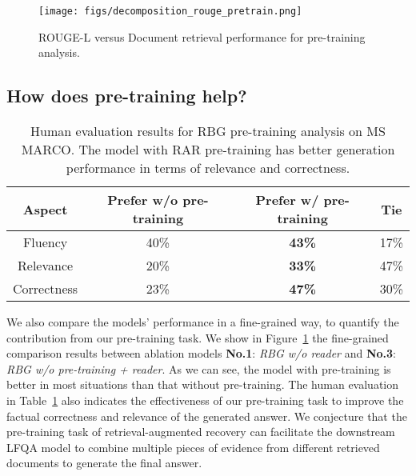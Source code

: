 \documentclass[11pt]{article}
\begin{document}
\begin{figure}[t]
\vspace{-5pt}
	\begin{center}
		\texttt{[image: figs/decomposition\_rouge\_pretrain.png]}
		\vspace{-5pt}
		\caption{ROUGE-L versus Document retrieval performance for pre-training analysis.}
		\label{Fig:decomp_for_pretrain}
	\end{center}
	\vspace{-10pt}
\end{figure}

\vspace{-5pt}
\subsection{How does pre-training help?}
\vspace{-5pt}

\begin{table}[]
\vspace{-10pt}
\resizebox{0.48\textwidth}{!}
{
\begin{tabular}{c|ccc}
\hline
Aspect    & Prefer w/o pre-training      & Prefer w/ pre-training      &  Tie \\ \hline
Fluency  &    40\%    & \textbf{43\%}   &    17\% \\
Relevance  &  20\%     & \textbf{33\%} & 47\% \\
Correctness &  23\%     & \textbf{47\%} & 30\% \\ \hline
\end{tabular}
}
\vspace{-5pt}
\caption{Human evaluation results for RBG pre-training analysis on MS MARCO. The model with RAR pre-training has better generation performance in terms of relevance and correctness.}
\label{tab:human eval pretrain}
\vspace{-10pt}
\end{table}

We also compare the models' performance in a fine-grained way, to quantify the contribution from our pre-training task. We show in Figure~\ref{Fig:decomp_for_pretrain} the fine-grained comparison results between ablation models \textbf{No.1}: \textit{RBG w/o reader} and \textbf{No.3}: \textit{RBG w/o pre-training + reader}. As we can see, the model with pre-training is better in most situations than that without pre-training. The human evaluation in Table~\ref{tab:human eval pretrain} also indicates the effectiveness of our pre-training task to improve the factual correctness and relevance of the generated answer. We conjecture that the pre-training task of retrieval-augmented recovery can facilitate the downstream LFQA model to combine multiple pieces of evidence from different retrieved documents to generate the final answer.
\end{document}
